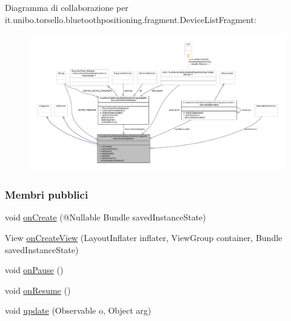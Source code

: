 Diagramma di collaborazione per it.\+unibo.\+torsello.\+bluetoothpositioning.\+fragment.\+Device\+List\+Fragment\+:
\nopagebreak
\begin{figure}[H]
\begin{center}
\leavevmode
\includegraphics[width=350pt]{classit_1_1unibo_1_1torsello_1_1bluetoothpositioning_1_1fragment_1_1DeviceListFragment__coll__graph}
\end{center}
\end{figure}
\subsubsection*{Membri pubblici}
\begin{DoxyCompactItemize}
\item 
void \hyperlink{classit_1_1unibo_1_1torsello_1_1bluetoothpositioning_1_1fragment_1_1DeviceListFragment_a6dc90ae91b0b8d10260a2d55ca193db6_a6dc90ae91b0b8d10260a2d55ca193db6}{on\+Create} (@Nullable Bundle saved\+Instance\+State)
\item 
View \hyperlink{classit_1_1unibo_1_1torsello_1_1bluetoothpositioning_1_1fragment_1_1DeviceListFragment_ae359841af9f15a6e1ccea49656a2c6aa_ae359841af9f15a6e1ccea49656a2c6aa}{on\+Create\+View} (Layout\+Inflater inflater, View\+Group container, Bundle saved\+Instance\+State)
\item 
void \hyperlink{classit_1_1unibo_1_1torsello_1_1bluetoothpositioning_1_1fragment_1_1DeviceListFragment_a664ab33df789cde4831b60b83ec31436_a664ab33df789cde4831b60b83ec31436}{on\+Pause} ()
\item 
void \hyperlink{classit_1_1unibo_1_1torsello_1_1bluetoothpositioning_1_1fragment_1_1DeviceListFragment_ab70d378c12ff5e9ffab0a61548119282_ab70d378c12ff5e9ffab0a61548119282}{on\+Resume} ()
\item 
void \hyperlink{classit_1_1unibo_1_1torsello_1_1bluetoothpositioning_1_1fragment_1_1DeviceListFragment_a5c8153bcb9d24c048d8f605f8f280557_a5c8153bcb9d24c048d8f605f8f280557}{update} (Observable o, Object arg)
\end{DoxyCompactItemize}
